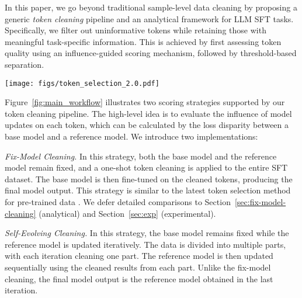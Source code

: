 In this paper, we go beyond traditional sample-level data cleaning by proposing a generic \emph{token cleaning} pipeline and an analytical framework for LLM SFT tasks. Specifically, we filter out uninformative tokens while retaining those with meaningful task-specific information. 
This is achieved by first assessing token quality using an influence-guided scoring mechanism, followed by threshold-based separation.

\begin{figure*}[t]
    \centering
    \texttt{[image: figs/token\_selection\_2.0.pdf]}
    \caption{Token cleaning pipelines. \textit{Fixed-Model Cleaning} applies a one-shot cleaning process to the entire dataset $\widetilde{D}$. In contrast, \textit{Self-Evolving Cleaning} follows an iterative approach. It begins with a warm-up phase, where a model is fine-tuned on the full tokens of split-$0$, denoted as $\widetilde{D}_0$, and then used to clean the next data split, transforming $\widetilde{D}_1$ into $\widehat{D}_1$. The reference model is subsequently updated by fine-tuning the warm-up model (i.e., the first reference model) on $\widehat{D}_1$. This iterative process continues, progressively refining the reference model with each newly cleaned data split.}
    \label{fig:main_workflow}
\end{figure*}

Figure~\ref{fig:main_workflow} illustrates two scoring strategies supported by our token cleaning pipeline. The high-level idea is to evaluate the influence of model updates on each token, which can be calculated by the loss disparity between a base model and a reference model. We introduce two implementations:
\squishlist
\item \textit{Fix-Model Cleaning.}
In this strategy, both the base model and the reference model remain fixed, and a one-shot token cleaning is applied to the entire SFT dataset. The base model is then fine-tuned on the cleaned tokens, producing the final model output. This strategy is similar to the latest token selection method for pre-trained data \cite{linnot}. We defer detailed comparisons to Section~\ref{sec:fix-model-cleaning} (analytical) and Section~\ref{sec:exp} (experimental).

\item \textit{Self-Evolving Cleaning.}
In this strategy, the base model remains fixed while the reference model is updated iteratively. The data is divided into multiple parts, with each iteration cleaning one part. The reference model is then updated sequentially using the cleaned results from each part. Unlike the fix-model cleaning, the final model output is the reference model obtained in the last iteration.
\squishend

